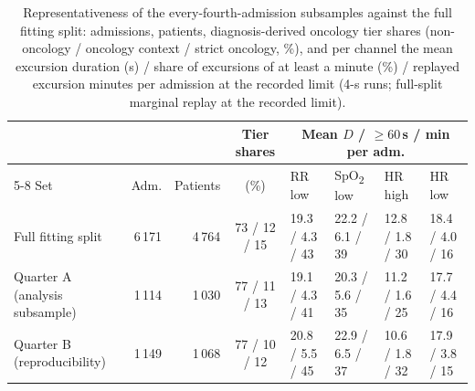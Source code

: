 \documentclass[11pt,letterpaper]{article}
\newcommand{\SpO}{SpO\textsubscript{2}}\newcommand{\tightnote}[1]{\par\smallskip{\footnotesize\raggedright #1\par}}
\begin{document}
\begin{table}[htbp]\centering\scriptsize
\setlength{\tabcolsep}{2.2pt}
\caption{Representativeness of the every-fourth-admission subsamples against the full fitting split: admissions,
patients, diagnosis-derived oncology tier shares (non-oncology / oncology context / strict oncology, \%), and per
channel the mean excursion duration (s) / share of excursions of at least a minute (\%) / replayed excursion
minutes per admission at the recorded limit (4-s runs; full-split marginal replay at the recorded limit).}
\label{tab:represent}
\begin{tabular}{@{}lrrcllll@{}}
\toprule
 & & & Tier shares & \multicolumn{4}{c}{Mean $D$ / $\ge60$\,s / min per adm.} \\
\cmidrule(lr){5-8}
Set & Adm. & Patients & (\%) & RR low & \SpO{} low & HR high & HR low \\
\midrule
Full fitting split & 6\,171 & 4\,764 & 73 / 12 / 15 & 19.3 / 4.3 / 43 & 22.2 / 6.1 / 39 & 12.8 / 1.8 / 30 & 18.4 / 4.0 / 16 \\
Quarter A (analysis subsample) & 1\,114 & 1\,030 & 77 / 11 / 13 & 19.1 / 4.3 / 41 & 20.3 / 5.6 / 35 & 11.2 / 1.6 / 25 & 17.7 / 4.4 / 16 \\
Quarter B (reproducibility) & 1\,149 & 1\,068 & 77 / 10 / 12 & 20.8 / 5.5 / 45 & 22.9 / 6.5 / 37 & 10.6 / 1.8 / 32 & 17.9 / 3.8 / 15 \\
\bottomrule
\end{tabular}
\end{table}

\end{document}
